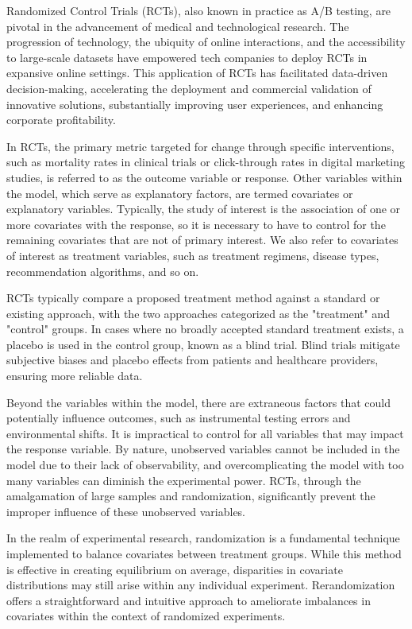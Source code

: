 
\begin{digest}

Randomized Control Trials (RCTs), also known in practice as A/B testing, are pivotal in the advancement of medical and technological research. The progression of technology, the ubiquity of online interactions, and the accessibility to large-scale datasets have empowered tech companies to deploy RCTs in expansive online settings. This application of RCTs has facilitated data-driven decision-making, accelerating the deployment and commercial validation of innovative solutions, substantially improving user experiences, and enhancing corporate profitability.

In RCTs, the primary metric targeted for change through specific interventions, such as mortality rates in clinical trials or click-through rates in digital marketing studies, is referred to as the outcome variable or response. Other variables within the model, which serve as explanatory factors, are termed covariates or explanatory variables. Typically, the study of interest is the association of one or more covariates with the response, so it is necessary to have to control for the remaining covariates that are not of primary interest. We also refer to covariates of interest as treatment variables, such as treatment regimens, disease types, recommendation algorithms, and so on.

RCTs typically compare a proposed treatment method against a standard or existing approach, with the two approaches categorized as the "treatment" and "control" groups. In cases where no broadly accepted standard treatment exists, a placebo is used in the control group, known as a blind trial. Blind trials mitigate subjective biases and placebo effects from patients and healthcare providers, ensuring more reliable data.

Beyond the variables within the model, there are extraneous factors that could potentially influence outcomes, such as instrumental testing errors and environmental shifts. It is impractical to control for all variables that may impact the response variable. By nature, unobserved variables cannot be included in the model due to their lack of observability, and overcomplicating the model with too many variables can diminish the experimental power. RCTs, through the amalgamation of large samples and randomization, significantly prevent the improper influence of these unobserved variables.

In the realm of experimental research, randomization is a fundamental technique implemented to balance covariates between treatment groups. While this method is effective in creating equilibrium on average, disparities in covariate distributions may still arise within any individual experiment. Rerandomization offers a straightforward and intuitive approach to ameliorate imbalances in covariates within the context of randomized experiments. 


\end{digest}
